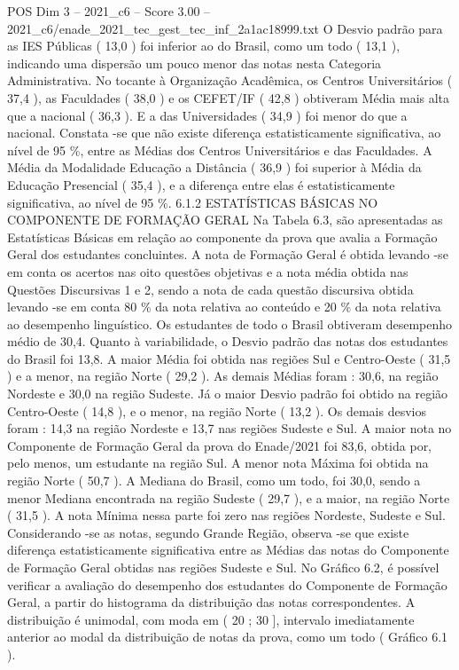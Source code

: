 \begin{textsample}{POS Dim 3 – 2021\_c6 – Score 3.00 – 2021\_c6/enade\_2021\_tec\_gest\_tec\_inf\_2a1ac18999.txt}
O Desvio padrão para as IES Públicas ( 13,0 ) foi inferior ao do Brasil, como um todo ( 13,1 ), indicando uma dispersão um pouco menor das notas nesta Categoria Administrativa.
No tocante à Organização Acadêmica, os Centros Universitários ( 37,4 ), as Faculdades ( 38,0 ) e os CEFET/IF ( 42,8 ) obtiveram Média mais alta que a nacional ( 36,3 ).
E a das Universidades ( 34,9 ) foi menor do que a nacional.
Constata -se que não existe diferença estatisticamente significativa, ao nível de 95 \%, entre as Médias dos Centros Universitários e das Faculdades.
A Média da Modalidade Educação a Distância ( 36,9 ) foi superior à Média da Educação Presencial ( 35,4 ), e a diferença entre elas é estatisticamente significativa, ao nível de 95 \%. 6.1.2 ESTATÍSTICAS BÁSICAS NO COMPONENTE DE FORMAÇÃO GERAL Na Tabela 6.3, são apresentadas as Estatísticas Básicas em relação ao componente da prova que avalia a Formação Geral dos estudantes concluintes.
A nota de Formação Geral é obtida levando -se em conta os acertos nas oito questões objetivas e a nota média obtida nas Questões Discursivas 1 e 2, sendo a nota de cada questão discursiva obtida levando -se em conta 80 \% da nota relativa ao conteúdo e 20 \% da nota relativa ao desempenho linguístico.
Os estudantes de todo o Brasil obtiveram desempenho médio de 30,4.
Quanto à variabilidade, o Desvio padrão das notas dos estudantes do Brasil foi 13,8.
A maior Média foi obtida nas regiões Sul e Centro-Oeste ( 31,5 ) e a menor, na região Norte ( 29,2 ).
As demais Médias foram : 30,6, na região Nordeste e 30,0 na região Sudeste.
Já o maior Desvio padrão foi obtido na região Centro-Oeste ( 14,8 ), e o menor, na região Norte ( 13,2 ).
Os demais desvios foram : 14,3 na região Nordeste e 13,7 nas regiões Sudeste e Sul.
A maior nota no Componente de Formação Geral da prova do Enade/2021 foi 83,6, obtida por, pelo menos, um estudante na região Sul.
A menor nota Máxima foi obtida na região Norte ( 50,7 ).
A Mediana do Brasil, como um todo, foi 30,0, sendo a menor Mediana encontrada na região Sudeste ( 29,7 ), e a maior, na região Norte ( 31,5 ).
A nota Mínima nessa parte foi zero nas regiões Nordeste, Sudeste e Sul.
Considerando -se as notas, segundo Grande Região, observa -se que existe diferença estatisticamente significativa entre as Médias das notas do Componente de Formação Geral obtidas nas regiões Sudeste e Sul.
No Gráfico 6.2, é possível verificar a avaliação do desempenho dos estudantes do Componente de Formação Geral, a partir do histograma da distribuição das notas correspondentes.
A distribuição é unimodal, com moda em ( 20 ; 30 ], intervalo imediatamente anterior ao modal da distribuição de notas da prova, como um todo ( Gráfico 6.1 ).

\end{textsample}
